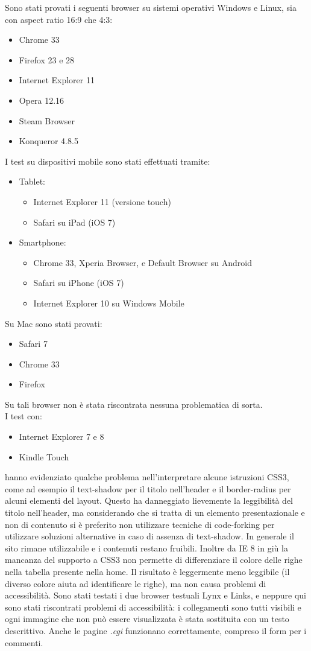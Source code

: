 \documentclass[10pt,a4paper,onecolumn]{article}
\begin{document}
Sono stati provati i seguenti browser su sistemi operativi Windows e Linux, sia con aspect ratio 16:9 che 4:3:
\begin{itemize}
 \item Chrome 33
 \item Firefox 23 e 28
 \item Internet Explorer 11
 \item Opera 12.16
 \item Steam Browser
 \item Konqueror 4.8.5
\end{itemize}
I test su dispositivi mobile sono stati effettuati tramite:
\begin{itemize}
 \item Tablet:
 \begin{itemize}
  \item Internet Explorer 11 (versione touch)
  \item Safari su iPad (iOS 7)
 \end{itemize}
 \item Smartphone:
 \begin{itemize}
  \item Chrome 33, Xperia Browser, e Default Browser su Android
  \item Safari su iPhone (iOS 7)
  \item Internet Explorer 10 su Windows Mobile
 \end{itemize}
\end{itemize}
Su Mac sono stati provati:
\begin{itemize}
 \item Safari 7
 \item Chrome 33
 \item Firefox 
\end{itemize}
Su tali browser non è stata riscontrata nessuna problematica di sorta. \\
I test con:
\begin{itemize}
 \item Internet Explorer 7 e 8
 \item Kindle Touch
\end{itemize}
hanno evidenziato qualche problema nell’interpretare alcune istruzioni CSS3, come ad esempio il text-shadow per il titolo nell’header e il border-radius per alcuni elementi del layout.
Questo ha danneggiato lievemente la leggibilità del titolo nell’header, ma considerando che si tratta di un elemento presentazionale e non di contenuto si è preferito non utilizzare tecniche di code-forking per utilizzare soluzioni alternative in caso di assenza di text-shadow.
In generale il sito rimane utilizzabile e i contenuti restano fruibili.
Inoltre da IE 8 in giù la mancanza del supporto a CSS3 non permette di differenziare il colore delle righe nella tabella presente nella home. Il risultato è leggermente meno leggibile (il diverso colore aiuta ad identificare le righe), ma non causa problemi di accessibilità.
Sono stati testati i due browser testuali Lynx e Links, e neppure qui sono stati riscontrati problemi di accessibilità: i collegamenti sono tutti visibili e ogni immagine che non può essere visualizzata è stata sostituita con un testo descrittivo. Anche le pagine \textit{.cgi} funzionano correttamente, compreso il form per i commenti.
\end{document}
